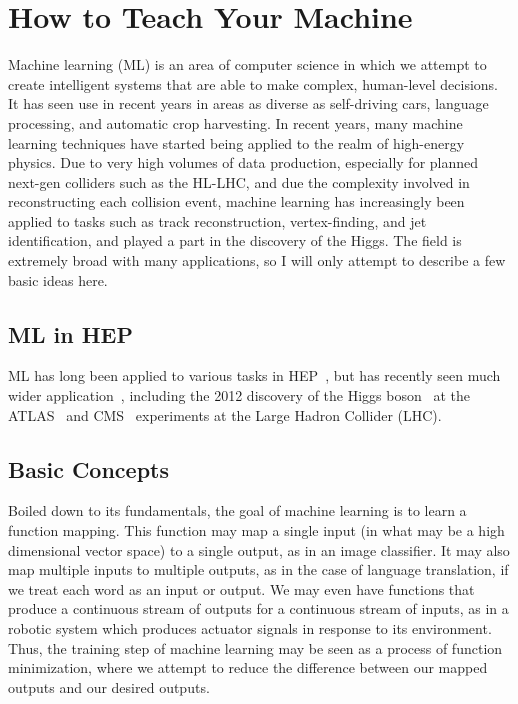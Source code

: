 \chapter{How to Teach Your Machine}

Machine learning (ML) is an area of computer science in which we attempt to create intelligent systems that are able to make complex, human-level decisions. It has seen use in recent years in areas as diverse as self-driving cars, language processing, and automatic crop harvesting. In recent years, many machine learning techniques have started being applied to the realm of high-energy physics. Due to very high volumes of data production, especially for planned next-gen colliders such as the HL-LHC, and due the complexity involved in reconstructing each collision event, machine learning has increasingly been applied to tasks such as track reconstruction, vertex-finding, and jet identification, and played a part in the discovery of the Higgs. The field is extremely broad with many applications, so I will only attempt to describe a few basic ideas here.

\section{ML in HEP}

ML has long been applied to various tasks in HEP~\cite{Denby:1987rk,Peterson:1988gs,Abreu:1992jp}, but has recently seen much wider application~\cite{jet_substructure_classification,parameterized_neural_networks,searching_for_exotic,weakly_supervised_classification,deep_learning_in,qcd-aware_recursive_neural}, including the 2012 discovery of the Higgs boson~\cite{HiggsATLAS,HiggsCMS} at the ATLAS~\cite{Aad:2008zzm} and CMS~\cite{Chatrchyan:2008aa} experiments at the Large Hadron Collider (LHC). 

\section{Basic Concepts}

Boiled down to its fundamentals, the goal of machine learning is to learn a function mapping. This function may map a single input (in what may be a high dimensional vector space) to a single output, as in an image classifier. It may also map multiple inputs to multiple outputs, as in the case of language translation, if we treat each word as an input or output. We may even have functions that produce a continuous stream of outputs for a continuous stream of inputs, as in a robotic system which produces actuator signals in response to its environment. Thus, the training step of machine learning may be seen as a process of function minimization, where we attempt to reduce the difference between our mapped outputs and our desired outputs.

